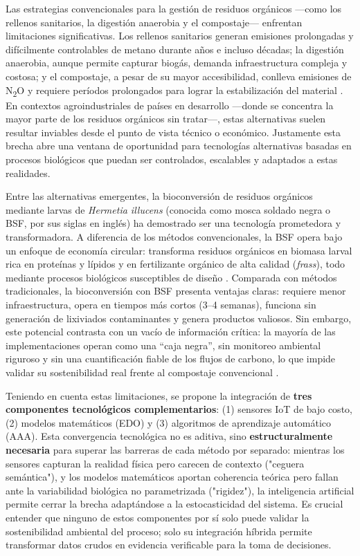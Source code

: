 Las estrategias convencionales para la gestión de residuos orgánicos —como los rellenos sanitarios, la digestión anaerobia y el compostaje— enfrentan limitaciones significativas. Los rellenos sanitarios generan emisiones prolongadas y difícilmente controlables de metano durante años e incluso décadas; la digestión anaerobia, aunque permite capturar biogás, demanda infraestructura compleja y costosa; y el compostaje, a pesar de su mayor accesibilidad, conlleva emisiones de N\textsubscript{2}O y requiere períodos prolongados para lograr la estabilización del material \parencite{kongEvaluatingGreenhouseGas2012,nordahlGreenhouseGasAir2023a}. En contextos agroindustriales de países en desarrollo —donde se concentra la mayor parte de los residuos orgánicos sin tratar—, estas alternativas suelen resultar inviables desde el punto de vista técnico o económico. Justamente esta brecha abre una ventana de oportunidad para tecnologías alternativas basadas en procesos biológicos que puedan ser controlados, escalables y adaptados a estas realidades.

Entre las alternativas emergentes, la bioconversión de residuos orgánicos mediante larvas de \textit{Hermetia illucens} (conocida como mosca soldado negra o BSF, por sus siglas en inglés) ha demostrado ser una tecnología prometedora y transformadora. A diferencia de los métodos convencionales, la BSF opera bajo un enfoque de economía circular: transforma residuos orgánicos en biomasa larval rica en proteínas y lípidos y en fertilizante orgánico de alta calidad (\textit{frass}), todo mediante procesos biológicos susceptibles de diseño \parencite{bermudez-serranoComprehensiveUtilizationBlack2023,surendraBioconversionOrganicWastes2016}. Comparada con métodos tradicionales, la bioconversión con BSF presenta ventajas claras: requiere menor infraestructura, opera en tiempos más cortos (3--4 semanas), funciona sin generación de lixiviados contaminantes y genera productos valiosos. Sin embargo, este potencial contrasta con un vacío de información crítica: la mayoría de las implementaciones operan como una ``caja negra'', sin monitoreo ambiental riguroso y sin una cuantificación fiable de los flujos de carbono, lo que impide validar su sostenibilidad real frente al compostaje convencional \parencite{jenkinsProcessingPoultryManure2025}.

Teniendo en cuenta estas limitaciones, se propone la integración de \textbf{tres componentes tecnológicos complementarios}: (1) sensores IoT de bajo costo, (2) modelos matemáticos (EDO) y (3) algoritmos de aprendizaje automático (AAA). Esta convergencia tecnológica no es aditiva, sino \textbf{estructuralmente necesaria} para superar las barreras de cada método por separado: mientras los sensores capturan la realidad física pero carecen de contexto ("ceguera semántica"), y los modelos matemáticos aportan coherencia teórica pero fallan ante la variabilidad biológica no parametrizada ("rigidez"), la inteligencia artificial permite cerrar la brecha adaptándose a la estocasticidad del sistema. Es crucial entender que ninguno de estos componentes por sí solo puede validar la sostenibilidad ambiental del proceso; solo su integración híbrida permite transformar datos crudos en evidencia verificable para la toma de decisiones.

